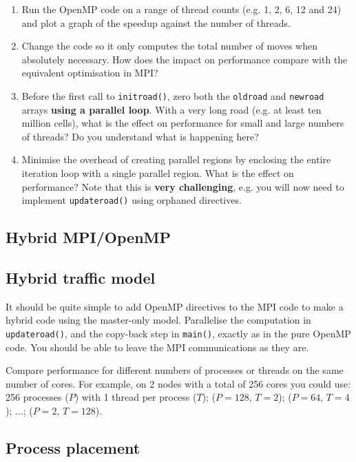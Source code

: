 \documentclass{article}
\begin{document}
\begin{enumerate}

\item Run the OpenMP code on a range of thread counts (e.g. 1, 2, 6,
  12 and 24) and plot a graph of the speedup against the number of
  threads.

\item Change the code so it only computes the total number of moves
  when absolutely necessary. How does the impact on performance
  compare with the equivalent optimisation in MPI?

\item Before the first call to \verb+initroad()+, zero both the
  \verb+oldroad+ and \verb+newroad+ arrays {\bf using a parallel
    loop}. With a very long road (e.g. at least ten million cells),
  what is the effect on performance for small and large numbers of
  threads? Do you understand what is happening here?

\item Minimise the overhead of creating parallel regions by enclosing
  the entire iteration loop with a single parallel region. What is the
  effect on performance?  Note that this is {\bf very challenging},
  e.g. you will now need to implement \verb+updateroad()+ using orphaned
  directives.

\end{enumerate}

\subsection{Hybrid MPI/OpenMP}

\subsection{Hybrid traffic model}

It should be quite simple to add OpenMP directives to the MPI code to
make a hybrid code using the master-only model. Parallelise the
computation in \verb+updateroad()+, and the copy-back step in
\verb+main()+, exactly as in the pure OpenMP code. You should be able
to leave the MPI communications as they are.

Compare performance for different numbers of processes or threads on
the same number of cores. For example, on 2 nodes with a total of 256
cores you could use: 256 processes ($P$) with 1 thread per process
($T$); ($P=128$, $T=2$); ($P=64$, $T=4$); $\ldots$; ($P=2$, $T=128$).

\subsection{Process placement}
\end{document}
